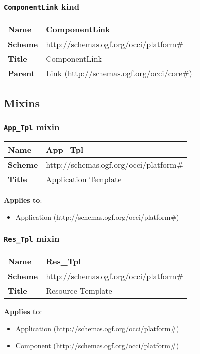 \subsubsection{\texttt{ComponentLink} kind}
\begin{center}
\begin{tabular}{|l|l|}
  \hline
  \textbf{Name} & ComponentLink \\
  \hline  
  \textbf{Scheme} & http://schemas.ogf.org/occi/platform\# \\
  \hline
  \textbf{Title} & ComponentLink \\
  \hline
  \textbf{Parent} & Link (http://schemas.ogf.org/occi/core\#) \\
  \hline
\end{tabular}
\end{center}


\subsection{Mixins}
\subsubsection{\texttt{App\_Tpl} mixin}
\begin{center}
\begin{tabular}{|l|l|}
  \hline
  \textbf{Name} & App\_Tpl \\
  \hline  
  \textbf{Scheme} & http://schemas.ogf.org/occi/platform\# \\
  \hline
  \textbf{Title} & Application Template \\
  \hline
\end{tabular}
\end{center}
\textbf{Applies to}:
\begin{itemize}
	\item Application (http://schemas.ogf.org/occi/platform\#)
\end{itemize}



\subsubsection{\texttt{Res\_Tpl} mixin}
\begin{center}
\begin{tabular}{|l|l|}
  \hline
  \textbf{Name} & Res\_Tpl \\
  \hline  
  \textbf{Scheme} & http://schemas.ogf.org/occi/platform\# \\
  \hline
  \textbf{Title} & Resource Template \\
  \hline
\end{tabular}
\end{center}
\textbf{Applies to}:
\begin{itemize}
	\item Application (http://schemas.ogf.org/occi/platform\#)
	\item Component (http://schemas.ogf.org/occi/platform\#)
\end{itemize}



